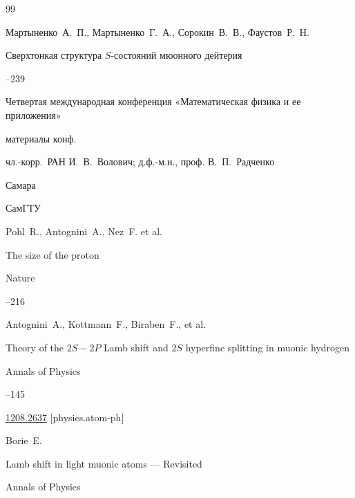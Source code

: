 \begin{thebibliography}{99}




\by  Мартыненко~А.~П., Мартыненко~Г.~А., Сорокин~В.~В., Фаустов~Р.~Н.

\paper Сверхтонкая структура $S$-состояний мюонного дейтерия 

--239

\inbook Четвертая международная конференция «Математическая физика и ее приложения»

\bookinfo материалы конф. 

\eds чл.-корр.~РАН И.~В.~Волович; д.ф.-м.н., проф. В.~П.~Радченко

\publaddr Самара

\publ СамГТУ







\by Pohl~R., Antognini~A., Nez~F. et al.

\paper The size of the proton

\jour Nature




--216





\by Antognini~A., Kottmann~F., Biraben~F., et al.

\paper Theory of the $2S{-}2P$ Lamb shift and $2S$ hyperfine splitting in muonic hydrogen

\jour Annals of Physics



--145


\arxiv \href{http://arxiv.org/abs/1208.2637}{1208.2637} [physics.atom-ph]




\by Borie~E.

\paper Lamb shift in light muonic atoms — Revisited

\jour Annals of Physics


\end{thebibliography}
